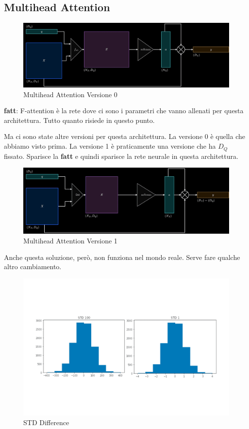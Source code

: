 \subsection{Multihead Attention}

\begin{figure}[H]
    \includegraphics[width=\textwidth]{images/evolution-Version-0.png}
    \caption{Multihead Attention Versione 0}
\end{figure}

\textbf{fatt}: F-attention è la rete dove ci sono i parametri che vanno allenati per questa architettura. Tutto quanto
risiede in questo punto.

Ma ci sono state altre versioni per questa architettura. La versione 0 è quella
che abbiamo visto prima. La versione 1 è praticamente una versione che ha $D_Q$
fissato. Sparisce la \textbf{fatt} e quindi sparisce la rete neurale in questa
architettura.

\begin{figure}[H]
    \includegraphics[width=\textwidth]{images/evolution-Version-1.png}
    \caption{Multihead Attention Versione 1}
\end{figure}

Anche questa soluzione, però, non funziona nel mondo reale. Serve fare qualche
altro cambiamento.

\begin{figure}[H]
    \includegraphics[width=\textwidth]{images/un-softmax-sol-diagram.png}
    \caption{STD Difference}
\end{figure}

